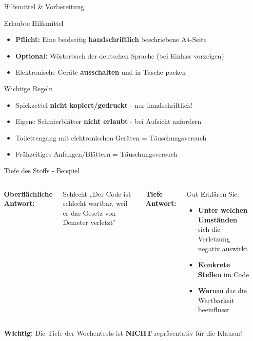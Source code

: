 \begin{frame}{Hilfsmittel \& Vorbereitung}
  \begin{exampleblock}{Erlaubte Hilfsmittel}
    \begin{itemize}
      \item \textbf{Pflicht:} Eine beidseitig \textbf{handschriftlich} beschriebene A4-Seite
      \item \textbf{Optional:} Wörterbuch der deutschen Sprache (bei Einlass vorzeigen)
      \item Elektronische Geräte \textbf{ausschalten} und in Tasche packen
    \end{itemize}
  \end{exampleblock}

  \begin{alertblock}{Wichtige Regeln}
    \begin{itemize}
      \item Spickzettel \textbf{nicht kopiert/gedruckt} - nur handschriftlich!
      \item Eigene Schmierblätter \textbf{nicht erlaubt} - bei Aufsicht anfordern
      \item Toilettengang mit elektronischen Geräten = Täuschungsversuch
      \item Frühzeitiges Anfangen/Blättern = Täuschungsversuch
    \end{itemize}
  \end{alertblock}
\end{frame}

\begin{frame}{Tiefe des Stoffs - Beispiel}
  \begin{columns}[T]
    \textbf{Oberflächliche Antwort:}
    \begin{alertblock}{Schlecht}
      „Der Code ist schlecht wartbar, weil er das Gesetz von Demeter verletzt"
    \end{alertblock}

    \textbf{Tiefe Antwort:}
    \begin{exampleblock}{Gut}
      Erklären Sie:
      \begin{itemize}
        \item \textbf{Unter welchen Umständen} sich die Verletzung negativ auswirkt
        \item \textbf{Konkrete Stellen} im Code
        \item \textbf{Warum} das die Wartbarkeit beeinflusst
      \end{itemize}
    \end{exampleblock}
  \end{columns}

  \vspace{0.5cm}
  \begin{center}
    \textbf{Wichtig:} Die Tiefe der Wochentests ist \textbf{NICHT} repräsentativ für die Klausur!
  \end{center}
\end{frame}


